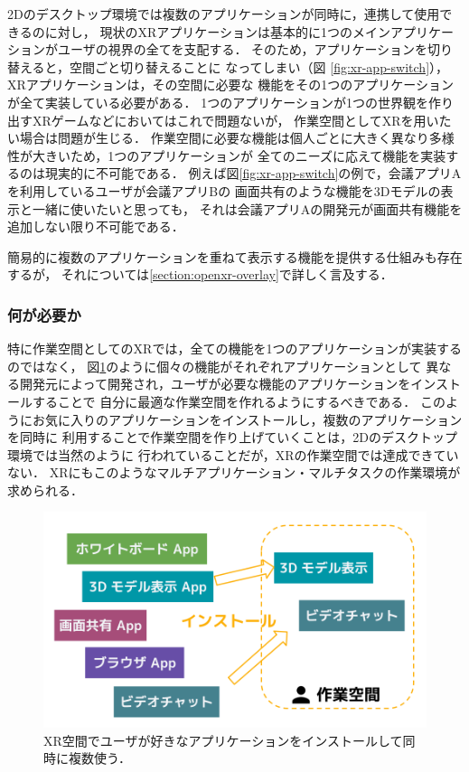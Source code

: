 2Dのデスクトップ環境では複数のアプリケーションが同時に，連携して使用できるのに対し，
現状のXRアプリケーションは基本的に1つのメインアプリケーションがユーザの視界の全てを支配する．
そのため，アプリケーションを切り替えると，空間ごと切り替えることに
なってしまい（図 \ref{fig:xr-app-switch}），XRアプリケーションは，その空間に必要な
機能をその1つのアプリケーションが全て実装している必要がある．
1つのアプリケーションが1つの世界観を作り出すXRゲームなどにおいてはこれで問題ないが，
作業空間としてXRを用いたい場合は問題が生じる．
作業空間に必要な機能は個人ごとに大きく異なり多様性が大きいため，1つのアプリケーションが
全てのニーズに応えて機能を実装するのは現実的に不可能である．
例えば図\ref{fig:xr-app-switch}の例で，会議アプリAを利用しているユーザが会議アプリBの
画面共有のような機能を3Dモデルの表示と一緒に使いたいと思っても，
それは会議アプリAの開発元が画面共有機能を追加しない限り不可能である．

簡易的に複数のアプリケーションを重ねて表示する機能を提供する仕組みも存在するが，
それについては\ref{section:openxr-overlay}で詳しく言及する．

\subsubsection{何が必要か}

特に作業空間としてのXRでは，全ての機能を1つのアプリケーションが実装するのではなく，
図\ref{fig:xr-app-install}のように個々の機能がそれぞれアプリケーションとして
異なる開発元によって開発され，ユーザが必要な機能のアプリケーションをインストールすることで
自分に最適な作業空間を作れるようにするべきである．
このようにお気に入りのアプリケーションをインストールし，複数のアプリケーションを同時に
利用することで作業空間を作り上げていくことは，2Dのデスクトップ環境では当然のように
行われていることだが，XRの作業空間では達成できていない．
XRにもこのようなマルチアプリケーション・マルチタスクの作業環境が求められる．

\begin{figure}[htbp]
  \begin{minipage}[t]{0.50\linewidth}
    \centering
    \includegraphics[keepaspectratio, width=\linewidth]{fig/xr-app-install.png}
    \caption{XR空間でユーザが好きなアプリケーションをインストールして同時に複数使う．}
    \label{fig:xr-app-install}
  \end{minipage}
\end{figure}
